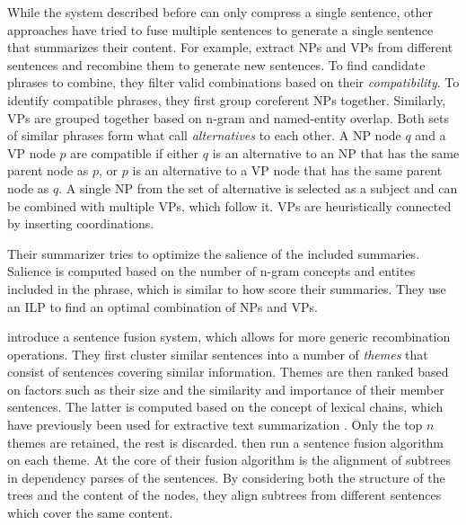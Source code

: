 \documentclass[a4paper,BCOR=10mm]{report}
\numberwithin{lemma}{chapter}
\numberwithin{definition}{chapter}
\begin{document}
While the system described before can only compress a single sentence, other approaches have tried to fuse multiple sentences to generate a single sentence that summarizes their content.
For example, \citet{bing} extract NPs and VPs from different sentences and recombine them to generate new sentences.
To find candidate phrases to combine, they filter valid combinations based on their \textit{compatibility}. To identify compatible phrases, they first group coreferent NPs together. Similarly, VPs are grouped together based on n-gram and named-entity overlap. Both sets of similar phrases form what \citeauthor{bing} call \textit{alternatives} to each other. A NP node $q$ and a VP node $p$ are compatible if either $q$ is an alternative to an NP that has the same parent node as $p$, or $p$ is an alternative to a VP node that has the same parent node as $q$. A single NP from the set of alternative is selected as a subject and can be combined with multiple VPs, which follow it. VPs are heuristically connected by inserting coordinations.

Their summarizer tries to optimize the salience of the included summaries. Salience is computed based on the number of n-gram concepts and entites included in the phrase, which is similar to how \citet{berg-kirkpatrick} score their summaries.
They use an ILP to find an optimal combination of NPs and VPs.

\citet{barzilay+mckeown} introduce a sentence fusion system, which allows for more generic recombination operations. They first cluster similar sentences into a number of \textit{themes} that consist of sentences covering similar information.
Themes are then ranked based on factors such as their size and the similarity and importance of their member sentences. The latter is computed based on the concept of lexical chains, which have previously been used for extractive text summarization \citep{lexical-chains}. Only the top $n$ themes are retained, the rest is discarded.
\citeauthor{barzilay+mckeown} then run a sentence fusion algorithm on each theme.
At the core of their fusion algorithm is the alignment of subtrees in dependency parses of the sentences.
By considering both the structure of the trees and the content of the nodes, they align subtrees from different sentences which cover the same content.
\end{document}
